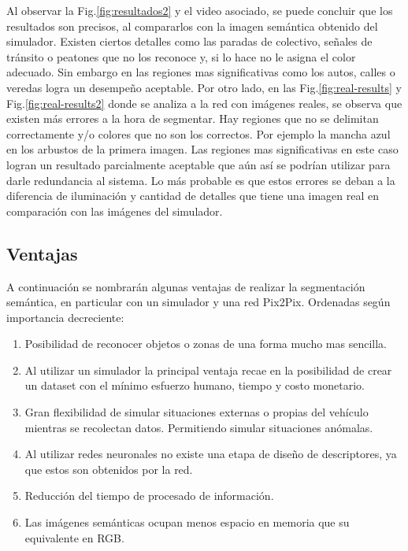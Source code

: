 \documentclass[]{IEEEtran}
\begin{document}
    Al observar la Fig.\ref{fig:resultados2} y el video asociado, se puede concluir que los resultados son precisos, al compararlos con la
    imagen semántica obtenido del simulador. Existen ciertos detalles como las paradas de colectivo, señales de tránsito o peatones que no los 
    reconoce y, si lo hace no le asigna el color adecuado. 
    Sin embargo en las regiones mas significativas como los autos, calles o veredas
    logra un desempeño aceptable. Por otro lado, en las Fig.\ref{fig:real-results} y Fig.\ref{fig:real-results2} donde se analiza a la red con imágenes reales,
    se observa que existen más errores a la hora de segmentar. Hay regiones que no se delimitan correctamente y/o colores que no son 
    los correctos. Por ejemplo la mancha azul en los arbustos de la primera imagen. Las regiones mas significativas en este caso logran un 
    resultado parcialmente aceptable que aún así se podrían utilizar para darle redundancia al sistema. Lo más probable es que estos 
    errores se deban a la diferencia de iluminación y cantidad de detalles que tiene una imagen real en comparación con las imágenes 
    del simulador.

    \subsection{Ventajas}

    A continuación se nombrarán algunas ventajas de realizar la segmentación semántica, en particular con un simulador y una red Pix2Pix. 
    Ordenadas según importancia decreciente:
    
    \begin{enumerate}
        \item Posibilidad de reconocer objetos o zonas de una forma
        mucho mas sencilla. 
        \item Al utilizar un simulador la principal ventaja recae en la posibilidad de crear un dataset con el mínimo esfuerzo humano, tiempo y costo monetario.
        \item Gran flexibilidad de simular situaciones externas o propias del
        vehículo mientras se recolectan datos. Permitiendo simular situaciones anómalas.
        \item Al utilizar redes neuronales no existe una etapa de diseño de descriptores, ya que estos son obtenidos por la red.
        \item Reducción del tiempo de procesado de información.
        \item Las imágenes semánticas ocupan menos espacio en memoria que su equivalente en RGB.
    \end{enumerate}
    
\end{document}
